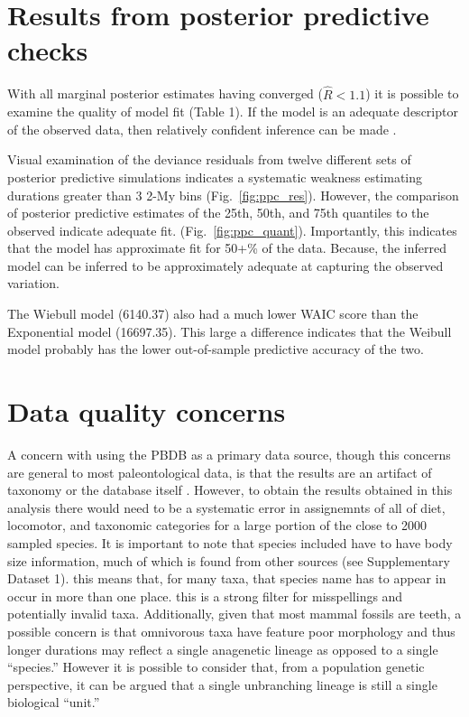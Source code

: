 \documentclass{article}
\begin{document}
\section{Results from posterior predictive checks}
With all marginal posterior estimates having converged (\(\hat{R} < 1.1\)) it is possible to examine the quality of model fit (Table 1). If the model is an adequate descriptor of the observed data, then relatively confident inference can be made \cite{Gelman2013d}.

Visual examination of the deviance residuals from twelve different sets of posterior predictive simulations indicates a systematic weakness estimating durations greater than 3 2-My bins (Fig.~\ref{fig:ppc_res}). However, the comparison of posterior predictive estimates of the 25th, 50th, and 75th quantiles to the observed indicate adequate fit. (Fig.~\ref{fig:ppc_quant}). Importantly, this indicates that the model has approximate fit for 50+\% of the data. Because, the inferred model can be inferred to be approximately adequate at capturing the observed variation.

The Wiebull model (6140.37) also had a much lower WAIC score than the Exponential model (16697.35). This large a difference indicates that the Weibull model probably has the lower out-of-sample predictive accuracy of the two.

\section{Data quality concerns}
A concern with using the PBDB as a primary data source, though this concerns are general to most paleontological data, is that the results are an artifact of taxonomy or the database itself \cite{Wagner2007}. However, to obtain the results obtained in this analysis there would need to be a systematic error in assignemnts of all of diet, locomotor, and taxonomic categories for a large portion of the close to 2000 sampled species. It is important to note that species included have to have body size information, much of which is found from other sources (see Supplementary Dataset 1). this means that, for many taxa, that species name has to appear in occur in more than one place. this is a strong filter for misspellings and potentially invalid taxa. Additionally, given that most mammal fossils are teeth, a possible concern is that omnivorous taxa have feature poor morphology and thus longer durations may reflect a single anagenetic lineage as opposed to a single ``species.'' However it is possible to consider that, from a population genetic perspective, it can be argued that a single unbranching lineage is still a single biological ``unit.''
\end{document}
